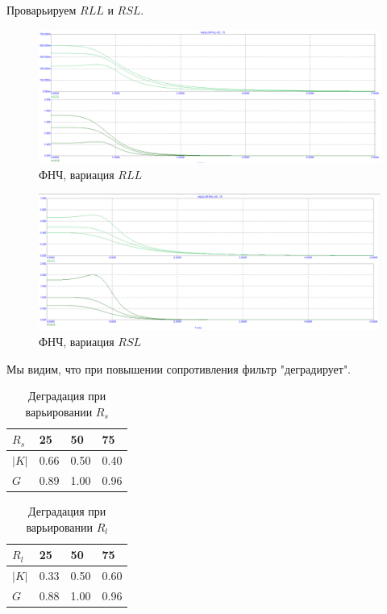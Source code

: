 \documentclass[12pt,a4paper]{article}
\begin{document}
	Проварьируем $RLL$ и $RSL$.

	\begin{figure}[H]
		\centering
		\includegraphics[width=1.0\linewidth]{res/imp3p_RLL.png}
		\caption{ФНЧ, вариация $RLL$}
		\label{rllrsl}
	\end{figure}
	
	\begin{figure}[H]
		\centering
		\includegraphics[width=1.0\linewidth]{res/imp3p_RSL.png}
		\caption{ФНЧ, вариация $RSL$}
		\label{rllrsl}
	\end{figure}
	
	

	Мы видим, что при повышении сопротивления фильтр "деградирует".

	\begin{table}[H]
		\begin{tabular}{llll}
			\hline
			$R_s$ & 25   & 50   & 75   \\ \hline
			$|K|$ & 0.66 & 0.50  & 0.40  \\
			$G$   & 0.89 & 1.00 & 0.96 \\ \hline
		\end{tabular}
		\caption{Деградация при варьировании $R_s$}
	\end{table}
	
	\begin{table}[H]
		\begin{tabular}{llll}
			\hline
			$R_l$ & 25   & 50   & 75   \\ \hline
			$|K|$ & 0.33 & 0.50  & 0.60  \\
			$G$   & 0.88 & 1.00 & 0.96 \\ \hline
		\end{tabular}
		\caption{Деградация при варьировании $R_l$}
	\end{table}
\end{document}
